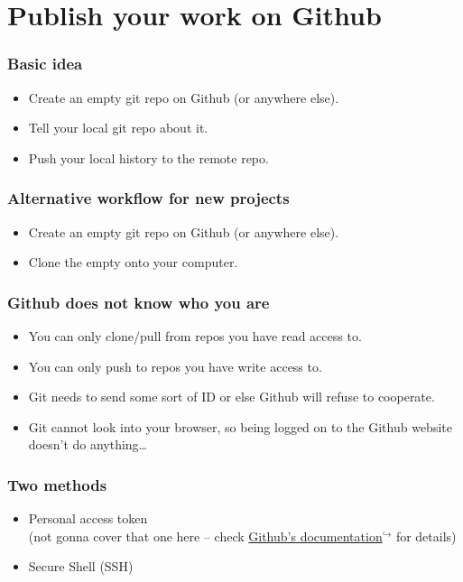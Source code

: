 \documentclass[12pt]{beamer}
\begin{document}
\section{Publish your work on Github}

\begin{frame}
  \frametitle{Basic idea}

  \begin{itemize}
    \item Create an empty git repo on Github (or anywhere else).
    \item Tell your local git repo about it.
    \item Push your local history to the remote repo.
  \end{itemize}
\end{frame}

\begin{frame}
  \frametitle{Alternative workflow for new projects}

  \begin{itemize}
    \item Create an empty git repo on Github (or anywhere else).
    \item Clone the empty onto your computer.
  \end{itemize}
\end{frame}

\begin{frame}
  \frametitle{Github does not know who you are}

  \begin{itemize}
    \item You can only clone/pull from repos you have read access to.
    \item You can only push to repos you have write access to.
    \item Git needs to send some sort of ID or else Github will refuse to
      cooperate.
    \item Git cannot look into your browser, so being logged on to the Github
      website doesn't do anything\dots{}
  \end{itemize}
\end{frame}

\begin{frame}
  \frametitle{Two methods}

  \begin{itemize}
    \item Personal access token\\
      (not gonna cover that one here -- check
      \href{https://docs.github.com/en/github/authenticating-to-github/keeping-your-account-and-data-secure/creating-a-personal-access-token#creating-a-token}%
      {Github's documentation$^{\hookrightarrow}$} for details)
    \item Secure Shell (SSH)
  \end{itemize}
\end{frame}
\end{document}

